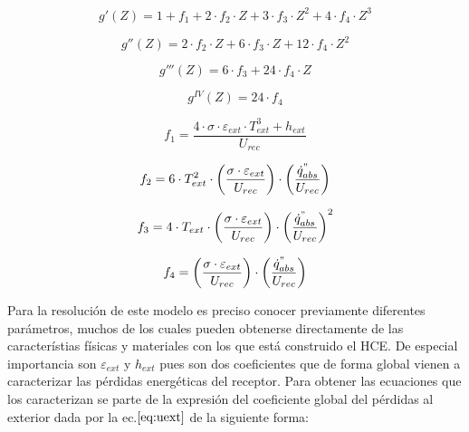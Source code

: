 \documentclass[11pt]{article}
\begin{document}
\begin{equation}
    g'(Z) = 1 + f_{1} + 2 \cdot f_{2} \cdot Z + 3 \cdot f_{3} \cdot Z^{2} + 4 \cdot f_{4} \cdot Z^{3} 
    \label{eq:gprimadezeta}
\end{equation}

\begin{equation}
    g''(Z) = 2 \cdot f_{2} \cdot Z + 6 \cdot f_{3} \cdot Z + 12 \cdot f_{4} \cdot Z^{2} 
    \label{eq:g2primadezeta}
\end{equation}

\begin{equation}
    g'''(Z) = 6 \cdot f_{3} + 24 \cdot f_{4} \cdot Z
    \label{eq:g3primadezeta}
\end{equation}

\begin{equation}
    g^{IV}(Z) = 24 \cdot f_{4}
    \label{eq:g4primadezeta}
\end{equation}

\begin{equation}
    f_{1} = \frac{4 \cdot \sigma \cdot \varepsilon_{ext} \cdot T_{ext}^{3} + h_{ext}}{U_{rec}}
    \label{eq:f1}
\end{equation}

\begin{equation}
    f_{2} = 6 \cdot T_{ext}^{2} \cdot \left(\frac{\sigma \cdot \varepsilon_{ext}}{U_{rec}} \right) \cdot \left(\frac{\dot{q}^{"}_{abs}}{U_{rec}}\right) 
    \label{eq:f2}
\end{equation}

\begin{equation}
    f_{3} = 4 \cdot T_{ext} \cdot \left(\frac{\sigma \cdot \varepsilon_{ext}}{U_{rec}} \right) \cdot \left(\frac{\dot{q}^{"}_{abs}}{U_{rec}}\right)^{2} 
    \label{eq:f3}
\end{equation}

\begin{equation}
    f_{4} = \left(\frac{\sigma \cdot \varepsilon_{ext}}{U_{rec}} \right) \cdot \left(\frac{\dot{q}^{"}_{abs}}{U_{rec}}\right) 
    \label{eq:f4}
\end{equation}

Para la resolución de este modelo es preciso conocer previamente
diferentes parámetros, muchos de los cuales pueden obtenerse
directamente de las característias físicas y materiales con los que está
construido el HCE. De especial importancia son \(\varepsilon_{ext}\) y
\(h_{ext}\) pues son dos coeficientes que de forma global vienen a
caracterizar las pérdidas energéticas del receptor. Para obtener las
ecuaciones que los caracterizan se parte de la expresión del coeficiente
global del pérdidas al exterior dada por la ec.\(\eqref{eq:uext}\) de la
siguiente forma:
\end{document}

